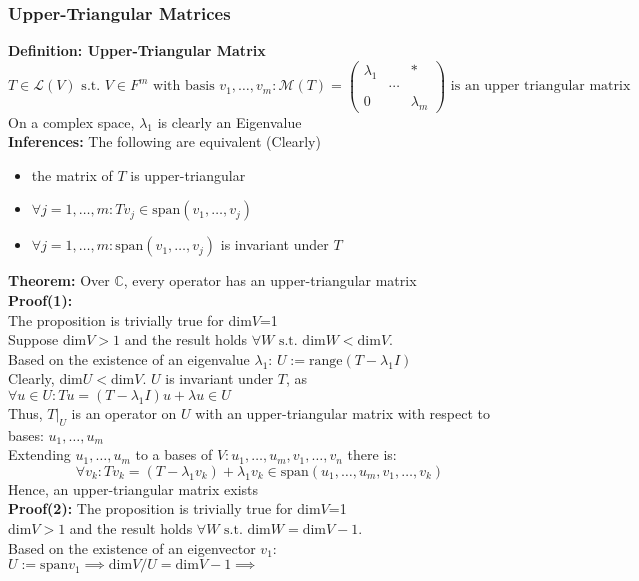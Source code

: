 \documentclass{article}
\newcommand{\st}{\mbox{ s.t. }}
\newcommand{\0}{{\bf{0}}}
\begin{document}
\subsubsection{Upper-Triangular Matrices}
\textbf{Definition: Upper-Triangular Matrix}
$$T\in\mathcal{L}(V)\st V\in F^m\mbox{ with basis }v_1,\dots,v_m:\mathcal{M}(T)=\begin{pmatrix}
    \lambda_1&&*\\
    &\cdots&\\
    0&&\lambda_m
\end{pmatrix}\mbox{ is an upper triangular matrix}$$
On a complex space, $\lambda_1$ is clearly an Eigenvalue\\
\textbf{Inferences:} The following are equivalent (Clearly)
\begin{itemize}
    \item the matrix of $T$ is upper-triangular
    \item $\forall j=1,\dots,m:Tv_j\in\mbox{span}(v_1,\dots,v_j)$
    \item $\forall j=1,\dots,m:\mbox{span}(v_1,\dots,v_j)$ is invariant under $T$
\end{itemize}
\textbf{Theorem:} Over $\mathbb{C}$, every operator has an upper-triangular matrix\\
\textbf{Proof(1):}\\
The proposition is trivially true for dim$V$=1\\
Suppose dim$V>1$ and the result holds $\forall W\st\mbox{dim}W<\mbox{dim}V$.\\
Based on the existence of an eigenvalue $\lambda_1$: $U:=\mbox{range}(T-\lambda_1I)$\\
Clearly, dim$U<$dim$V$. $U$ is invariant under $T$, as $\forall u\in U:Tu=(T-\lambda_1I)u+\lambda u\in U$\\
Thus, $T|_U$ is an operator on $U$ with an upper-triangular matrix with respect to bases: $u_1,\dots,u_m$\\
Extending $u_1,\dots,u_m$ to a bases of $V: u_1,\dots,u_m,v_1,\dots,v_n$ there is:
$$\forall v_k:Tv_k=(T-\lambda_1v_k)+\lambda_1v_k\in\mbox{span}(u_1,\dots,u_m,v_1,\dots,v_k)$$
Hence, an upper-triangular matrix exists\\
\textbf{Proof(2):}
The proposition is trivially true for dim$V$=1\\
dim$V>1$ and the result holds $\forall W\st\mbox{dim}W=\mbox{dim}V-1$.\\
Based on the existence of an eigenvector $v_1$: $U:=\mbox{span}v_1\implies\mbox{dim}V/U=\mbox{dim}V-1\implies$\\
\end{document}
